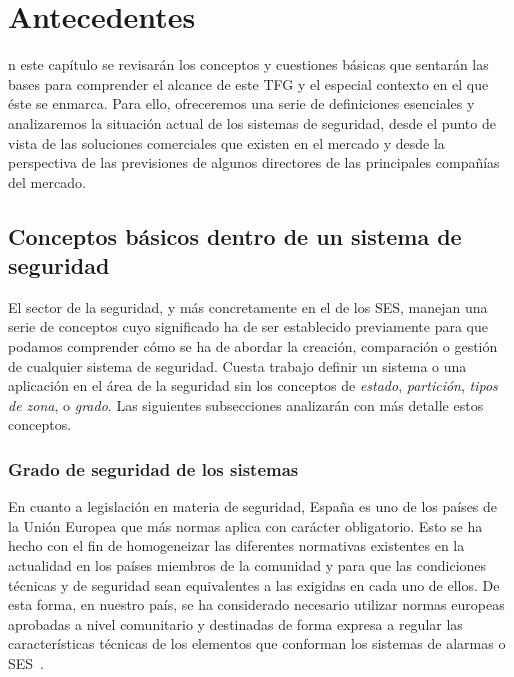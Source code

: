 \chapter{Antecedentes}
\label{chap:antecedentes}

n  este  capítulo  se  revisarán los  conceptos  y  cuestiones
básicas  que sentarán  las bases  para comprender  el alcance  de este
\acs{TFG} y el especial contexto en el que éste se enmarca. Para ello,
ofreceremos  una serie  de definiciones  esenciales y  analizaremos la
situación actual de los sistemas de seguridad, desde el punto de vista
de las  soluciones comerciales que  existen en  el mercado y  desde la
perspectiva  de   las  previsiones   de  algunos  directores   de  las
principales compañías del mercado.

\section{Conceptos básicos dentro de un sistema de seguridad}
El sector de  la seguridad, y más concretamente en  el de los \acf{SES}, manejan  una  serie  de  conceptos  cuyo
significado  ha  de  ser  establecido  previamente  para  que  podamos
comprender cómo se ha de abordar  la creación, comparación o  gestión de
cualquier sistema de  seguridad.  Cuesta trabajo definir  un sistema o
una  aplicación en  el  área  de la  seguridad  sin  los conceptos  de
\textit{estado},   \textit{partición},  \textit{tipos   de  zona},   o
\textit{grado}. Las siguientes subsecciones analizarán con más detalle
estos conceptos.

\subsection{Grado de seguridad de los sistemas}

En cuanto a legislación en materia  de seguridad, España es uno de los
países  de  la  Unión  Europea  que más  normas  aplica  con  carácter
obligatorio.  Esto  se  ha  hecho  con  el  fin  de  homogeneizar  las
diferentes  normativas  existentes  en  la actualidad  en  los  países
miembros de  la comunidad  y para  que las  condiciones técnicas  y de
seguridad sean  equivalentes a las exigidas  en cada uno de  ellos. De
esta forma, en nuestro país, se ha considerado necesario utilizar normas
europeas aprobadas a nivel comunitario y destinadas de forma expresa a
regular las  características técnicas  de los elementos  que conforman
los sistemas de alarmas o \acs{SES}~\cite{BOE}.

